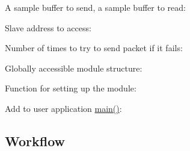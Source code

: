 \begin{DoxyItemize}
\item A sample buffer to send, a sample buffer to read\+: 
\begin{DoxyCodeInclude}{0}
\end{DoxyCodeInclude}

\item Slave address to access\+: 
\begin{DoxyCodeInclude}{0}
\end{DoxyCodeInclude}

\item Number of times to try to send packet if it fails\+: 
\begin{DoxyCodeInclude}{0}
\end{DoxyCodeInclude}

\item Globally accessible module structure\+: 
\begin{DoxyCodeInclude}{0}
\end{DoxyCodeInclude}

\item Function for setting up the module\+: 
\begin{DoxyCodeInclude}{0}
\end{DoxyCodeInclude}

\item Add to user application {\ttfamily \mbox{\hyperlink{csc__app_8c_a840291bc02cba5474a4cb46a9b9566fe}{main()}}}\+: 
\begin{DoxyCodeInclude}{0}
\end{DoxyCodeInclude}
 
\end{DoxyItemize}\hypertarget{asfdoc_sam0_sercom_i2c_master_basic_use_case_asfdoc_sam0_sercom_i2c_master_basic_use_setup_workflow}{}\subsection{Workflow}\label{asfdoc_sam0_sercom_i2c_master_basic_use_case_asfdoc_sam0_sercom_i2c_master_basic_use_setup_workflow}

